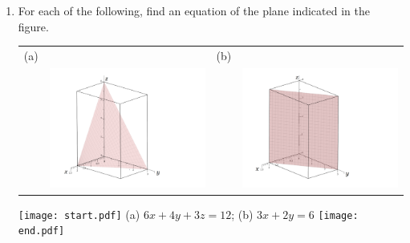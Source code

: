 \documentclass[12pt]{article}
\begin{document}
\begin{enumerate}

\item For each of the following, find an equation of the plane indicated in the figure.

\begin{tabular}{cccc}
(a)& & (b)&\\
&\includegraphics[scale=0.35]{plane2.pdf}&&\includegraphics[scale=0.35]{plane1.pdf}
\end{tabular}

\texttt{[image: start.pdf]}
{{(a) $6x+4y+3z=12$; (b) $3x+2y=6$}}
\texttt{[image: end.pdf]}


\end{enumerate}
\end{document}
